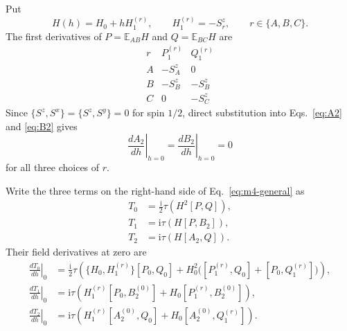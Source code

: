\documentclass[11pt]{article}
\newcommand{\ii}{\mathrm{i}}
\newcommand{\E}{\mathbb{E}}
\begin{document}
Put
\begin{equation}
 H(h)=H_0+hH_1^{(r)},
 \qquad
 H_1^{(r)}=-S_r^z,
 \qquad r\in\{A,B,C\}.
 \label{eq:field-perturbation}
\end{equation}
The first derivatives of $P=\E_{AB}H$ and $Q=\E_{BC}H$ are
\begin{equation}
\begin{array}{c|cc}
 r&P_1^{(r)}&Q_1^{(r)}\\
 \hline
 A&-S_A^z&0\\
 B&-S_B^z&-S_B^z\\
 C&0&-S_C^z
\end{array}
\label{eq:P1Q1-table}
\end{equation}
Since $\{S^z,S^x\}=\{S^z,S^y\}=0$ for spin $1/2$, direct substitution into
Eqs.~\eqref{eq:A2} and \eqref{eq:B2} gives
\begin{equation}
 \left.\frac{dA_2}{dh}\right|_{h=0}
 =\left.\frac{dB_2}{dh}\right|_{h=0}=0
 \label{eq:A2B2-derivatives}
\end{equation}
for all three choices of $r$.

Write the three terms on the right-hand side of
Eq.~\eqref{eq:m4-general} as
\begin{align}
 T_0&=\frac{\ii}{2}\tau(H^2[P,Q]),
 \label{eq:T0}\\
 T_1&=\ii\tau(H[P,B_2]),
 \label{eq:T1}\\
 T_2&=\ii\tau(H[A_2,Q]).
 \label{eq:T2}
\end{align}
Their field derivatives at zero are
\begin{align}
 \left.\frac{dT_0}{dh}\right|_0
 &=\frac{\ii}{2}\tau\left(
 \{H_0,H_1^{(r)}\}[P_0,Q_0]
 +H_0^2\bigl([P_1^{(r)},Q_0]+[P_0,Q_1^{(r)}]\bigr)
 \right),
 \label{eq:T0-derivative}\\
 \left.\frac{dT_1}{dh}\right|_0
 &=\ii\tau\left(
 H_1^{(r)}[P_0,B_2^{(0)}]
 +H_0[P_1^{(r)},B_2^{(0)}]
 \right),
 \label{eq:T1-derivative}\\
 \left.\frac{dT_2}{dh}\right|_0
 &=\ii\tau\left(
 H_1^{(r)}[A_2^{(0)},Q_0]
 +H_0[A_2^{(0)},Q_1^{(r)}]
 \right).
 \label{eq:T2-derivative}
\end{align}
\end{document}
